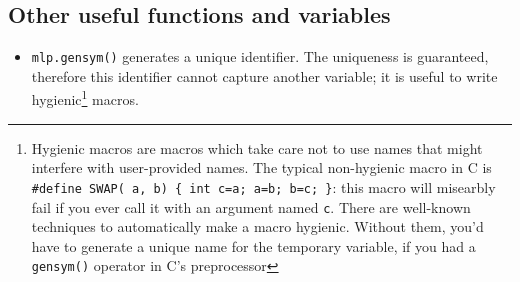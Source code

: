 \subsection{Other useful functions and variables}

\begin{itemize}
\item{\tt mlp.gensym()} generates a unique identifier. The uniqueness
  is guaranteed, therefore this identifier cannot capture another
  variable; it is useful to write hygienic\footnote{Hygienic macros
    are macros which take care not to use names that might interfere
    with user-provided names. The typical non-hygienic macro in C
    is {\tt \#define SWAP( a, b) \{ int c=a; a=b; b=c; \}}: this macro
    will misearbly fail if you ever call it with an argument named
    {\tt c}. There are well-known techniques to automatically make a
    macro hygienic. Without them, you'd have to generate a unique name
    for the temporary variable, if you had a {\tt gensym()} operator
    in C's preprocessor} macros. 
\end{itemize}
